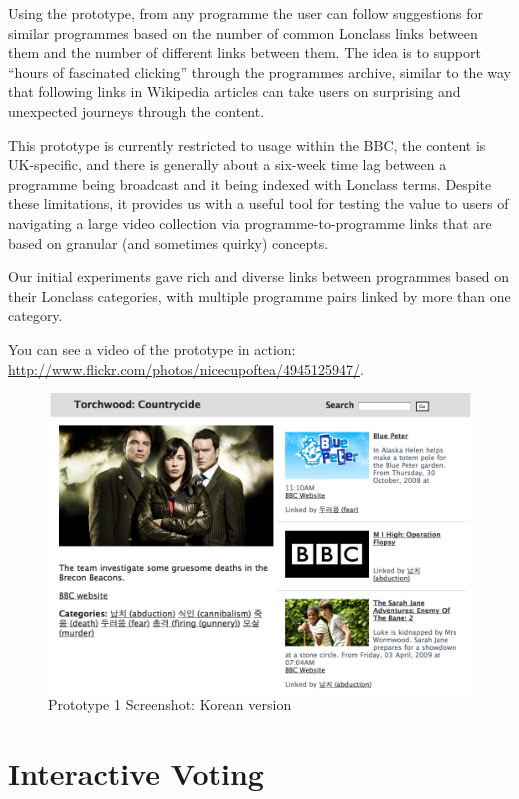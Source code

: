 \documentclass{notube}
\begin{document}
Using the prototype, from any programme the user can follow suggestions for similar programmes based on the number of common Lonclass links between them and the number of different links between them. The idea is to support ``hours of fascinated clicking'' through the programmes archive, similar to the way that following links in Wikipedia articles can take users on surprising and unexpected journeys through the content. 

This prototype is currently restricted to usage within the BBC, the content is UK-specific, and there is generally about a six-week time lag between a programme being broadcast and it being indexed with Lonclass terms. Despite these limitations, it provides us with a useful tool for testing the value to users of navigating a large video collection via programme-to-programme links that are based on granular (and sometimes quirky) concepts.

Our initial experiments gave rich and diverse links between programmes based on their Lonclass categories, with multiple programme pairs linked by more than one category.

You can see a video of the prototype in action:  \url{http://www.flickr.com/photos/nicecupoftea/4945125947/}.

\begin{figure}[htbp]
\begin{center}
\includegraphics[width=6in]{images/countrycide.png}
\caption{Prototype 1 Screenshot: Korean version} \label{fig:prototype1}
\end{center}
\end{figure}


\section{Interactive Voting}
\end{document}
